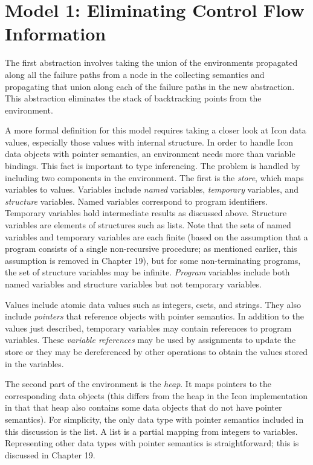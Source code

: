\section{Model 1: Eliminating Control Flow Information}

The first abstraction involves taking the union of the environments
propagated along all the failure paths from a node in the collecting
semantics and propagating that union along each of the failure paths
in the new abstraction. This abstraction eliminates the stack of
backtracking points from the environment.

A more formal definition for this model requires taking a closer look
at Icon data values, especially those values with internal
structure. In order to handle Icon data objects with pointer
semantics, an environment needs more than variable bindings. This fact
is important to type inferencing. The problem is handled by including
two components in the environment. The first is the \textit{store},
which maps variables to values. Variables include \textit{named}
variables, \textit{temporary} variables, and \textit{structure}
variables. Named variables correspond to program
identifiers. Temporary variables hold intermediate results as
discussed above. Structure variables are elements of structures such
as lists. Note that the sets of named variables and temporary
variables are each finite (based on the assumption that a program
consists of a single non-recursive procedure; as mentioned earlier,
this assumption is removed in Chapter 19), but for some
non-terminating programs, the set of structure variables may be
infinite.  \textit{Program} variables include both named variables and
structure variables but not temporary variables.

Values include atomic data values such as integers, csets, and
strings. They also include \textit{pointers} that reference objects
with pointer semantics. In addition to the values just described,
temporary variables may contain references to program variables. These
\textit{variable references} may be used by assignments to update the
store or they may be dereferenced by other operations to obtain the
values stored in the variables.

The second part of the environment is the \textit{heap}. It maps
pointers to the corresponding data objects (this differs from the heap
in the Icon implementation in that that heap also contains some data
objects that do not have pointer semantics). For simplicity, the only
data type with pointer semantics included in this discussion is the
list.  A list is a partial mapping from integers to
variables. Representing other data types with pointer semantics is
straightforward; this is discussed in Chapter 19.

